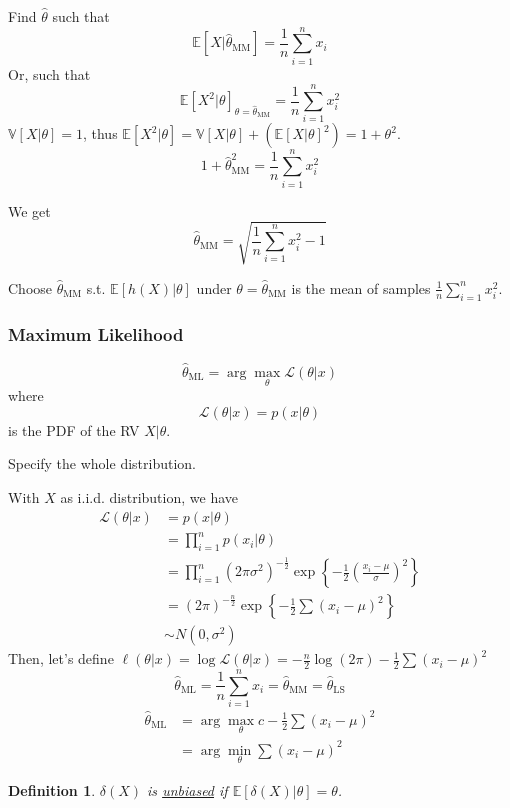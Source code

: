 \documentclass{article}
\newtheorem{definition}{Definition}
\begin{document}
Find $\hat{\theta}$ such that
\[ \mathbb{E}[X|\hat{\theta}_{\text{MM}}] = \frac{1}{n} \sum_{i=1}^n x_i \]
Or, such that
\[ \mathbb{E}[X^2|\theta]_{\theta = \hat{\theta}_{\text{MM}}} = \frac{1}{n} \sum_{i=1}^n x_i^2 \]
$\mathbb{V}[X|\theta] = 1$, thus $\mathbb{E}[X^2|\theta] = \mathbb{V}[X|\theta] + (\mathbb{E}[X|\theta]^2) = 1 + \theta^2$. 
\[ 1 + \hat{\theta}_{\text{MM}}^2 = \frac{1}{n} \sum_{i=1}^n x_i^2 \]

We get
\[ \hat{\theta}_{\text{MM}} = \sqrt{\frac{1}{n} \sum_{i=1}^n x_i^2 - 1} \]
\begin{note*}
  Choose $\hat{\theta}_{\text{MM}}$ s.t. $\mathbb{E}[h(X)|\theta]$ under $\theta = \hat{\theta}_{\text{MM}}$ is the mean of samples $\frac{1}{n} \sum_{i=1}^n x_i^2$.
\end{note*}

\subsubsection{Maximum Likelihood}

\[ \hat{\theta}_{\text{ML}} = \arg \max_{\theta} \mathcal{L}(\theta|x) \]
where
\[ \mathcal{L}(\theta|x) = p(x|\theta) \]
is the PDF of the RV $X|\theta$.

\begin{note*}
  Specify the whole distribution.
\end{note*}

With $X$ as i.i.d. distribution, we have
\begin{align*}
  \mathcal{L}(\theta|x) & = p(x|\theta) \\
  & = \prod_{i=1}^n p(x_i|\theta) \\
  & = \prod_{i=1}^n (2\pi\sigma^2)^{-\frac{1}{2}} \exp \left\{ -\frac{1}{2} \left( \frac{x_i - \mu}{\sigma} \right)^2 \right\} \\
  & = (2\pi)^{-\frac{n}{2}} \exp \left\{ -\frac{1}{2} \sum (x_i - \mu)^2 \right\} \\
  & \sim N(0, \sigma^2)
\end{align*}
Then, let's define $\ell(\theta|x) = \log \mathcal{L}(\theta|x) = -\frac{n}{2} \log(2\pi) -\frac{1}{2} \sum (x_i - \mu)^2$
\[ \hat{\theta}_{\text{ML}} = \frac{1}{n} \sum_{i=1}^n x_i = \hat{\theta}_{\text{MM}} = \hat{\theta}_{\text{LS}} \]
\begin{align*}
  \hat{\theta}_{\text{ML}} & = \arg \max_{\theta} c - \frac{1}{2} \sum (x_i - \mu)^2\\
  & = \arg \min_{\theta} \sum (x_i - \mu)^2
\end{align*}
\begin{definition}
  $\delta(X)$ is \underline{unbiased} if $\mathbb{E}[\delta(X)|\theta] = \theta$.
\end{definition}
\end{document}

